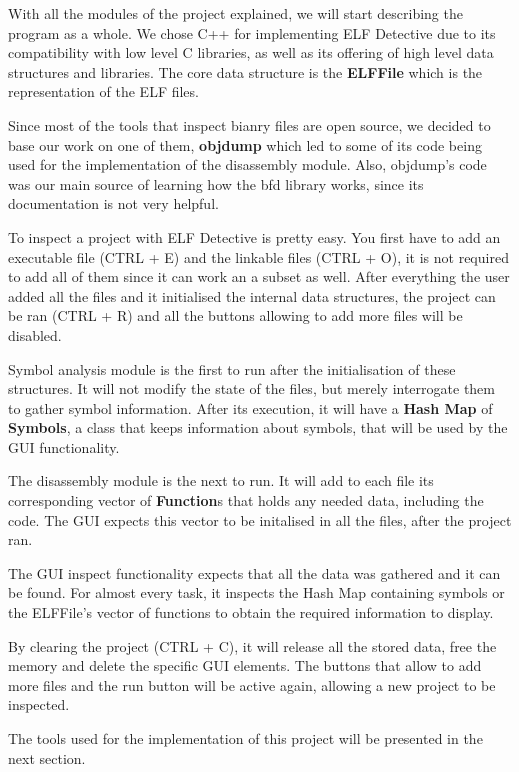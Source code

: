 
With all the modules of the project explained, we will start describing the program as a whole. We chose C++ for implementing ELF Detective due to its compatibility with low level C libraries, as well as its offering of high level data structures and libraries. The core data structure is the \textbf{ELFFile} which is the representation of the ELF files.

Since most of the tools that inspect bianry files are open source, we decided to base our work on one of them, \textbf{objdump} which led to  some of its code being used for the implementation of the disassembly module. Also, objdump's code was our main source of learning how the bfd library works, since its documentation is not very helpful.

To inspect a project with ELF Detective is pretty easy. You first have to add an executable file (CTRL + E) and the linkable files (CTRL + O), it is not required to add all of them since it can work an a subset as well. After everything the user added all the files and it initialised the internal data structures, the project can be ran (CTRL + R) and all the buttons allowing to add more files will be disabled.

Symbol analysis module is the first to run after the initialisation of these structures. It will not modify the state of the files, but merely interrogate them to gather symbol information. After its execution, it will have a \textbf{Hash Map} of \textbf{Symbols}, a class that keeps information about symbols, that will be used by the GUI functionality.

The disassembly module is the next to run. It will add to each file its corresponding vector of \textbf{Function}s that holds any needed data, including the code. The GUI expects this vector to be initalised in all the files, after the project ran.

The GUI inspect functionality expects that all the data was gathered and it can be found. For almost every task, it inspects the Hash Map containing symbols or the ELFFile's vector of functions to obtain the required information to display.

By clearing the project (CTRL + C), it will release all the stored data, free the memory and delete the specific GUI elements. The buttons that allow to add more files and the run button will be active again, allowing a new project to be inspected.

The tools used for the implementation of this project will be presented in the next section.

